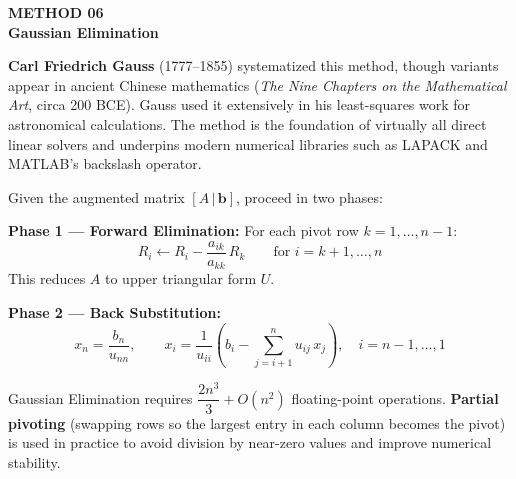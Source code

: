 \documentclass[12pt]{article}
\begin{document}
\newpage


\begin{tcolorbox}[
  enhanced, arc=0pt, boxrule=0pt,
  colback=primary, colframe=primary,
  left=16pt, right=16pt, top=14pt, bottom=10pt,
  borderline south={4pt}{0pt}{accent},
]
  {\color{accent!70}\small\bfseries METHOD 06}\\[4pt]
  {\LARGE\bfseries\color{white} Gaussian Elimination}
\end{tcolorbox}

\vspace{10pt}

\begin{histbox}
\textbf{Carl Friedrich Gauss} (1777--1855) systematized this method, though variants appear in ancient Chinese mathematics (\textit{The Nine Chapters on the Mathematical Art}, circa 200 BCE). Gauss used it extensively in his least-squares work for astronomical calculations. The method is the foundation of virtually all direct linear solvers and underpins modern numerical libraries such as LAPACK and MATLAB's backslash operator.
\end{histbox}

\bigskip

\begin{defbox}
Given the augmented matrix $[A\,|\,\mathbf{b}]$, proceed in two phases:

\textbf{Phase 1 — Forward Elimination:} For each pivot row $k = 1,\ldots,n-1$:
\[
  R_i \leftarrow R_i - \frac{a_{ik}}{a_{kk}}\,R_k \qquad \text{for } i = k+1,\ldots,n
\]
This reduces $A$ to upper triangular form $U$.

\textbf{Phase 2 — Back Substitution:}
\[
  x_n = \frac{b_n}{u_{nn}}, \qquad
  x_i = \frac{1}{u_{ii}}\!\left(b_i - \sum_{j=i+1}^{n} u_{ij}\,x_j\right), \quad i = n-1,\ldots,1
\]
\end{defbox}

\begin{thmbox}
Gaussian Elimination requires $\dfrac{2n^3}{3} + O(n^2)$ floating-point operations. \textbf{Partial pivoting} (swapping rows so the largest entry in each column becomes the pivot) is used in practice to avoid division by near-zero values and improve numerical stability.
\end{thmbox}
\end{document}

